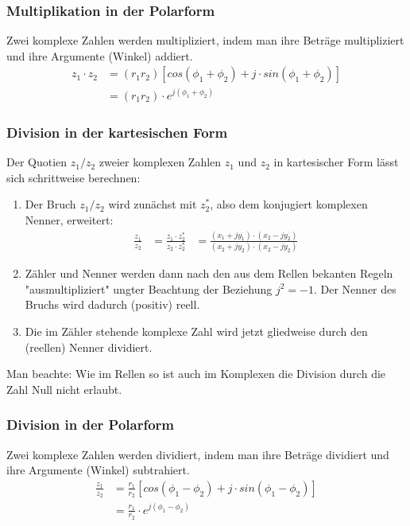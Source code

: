 \subsubsection*{Multiplikation in der Polarform}
\begin{definition}
Zwei komplexe Zahlen werden multipliziert, indem man ihre Beträge multipliziert und ihre Argumente (Winkel) addiert.
\begin{align*}
	z_1 \cdot z_2 	&= (r_1r_2)[cos(\phi_1 +\phi_2) +j \cdot sin(\phi_1 + \phi_2)] \\
							&= (r_1r_2) \cdot e^{j(\phi_1 + \phi_2)}
\end{align*}
\end{definition}

\subsubsection*{Division in der kartesischen Form}
\begin{definition}
Der Quotien $z_1/z_2$ zweier komplexen Zahlen $z_1$ und $z_2$ in kartesischer Form lässt sich schrittweise berechnen:
\begin{enumerate}
	\item Der Bruch $z_1/z_2$ wird zunächst mit $z_2^*$, also dem konjugiert komplexen Nenner, erweitert:
	\begin{align*}
	\frac{z_1}{z_2} 	&= \frac{z_1 \cdot z_2^*}{z_2 \cdot z_2^*} &= \frac{(x_1 +jy_1) \cdot (x_2-jy_2)}{(x_2+jy_2)\cdot (x_2-jy_2)}
\end{align*}
	\item Zähler und Nenner werden dann nach den aus dem Rellen bekanten Regeln "ausmultipliziert" ungter Beachtung der Beziehung $j^2 = -1$. Der Nenner des Bruchs wird dadurch (positiv) reell.
	\item Die im Zähler stehende komplexe Zahl wird jetzt gliedweise durch den (reellen) Nenner dividiert.
\end{enumerate}
Man beachte: Wie im Rellen so ist auch im Komplexen die Division durch die Zahl Null nicht erlaubt.
\end{definition}

\subsubsection*{Division in der Polarform}
\begin{definition}
Zwei komplexe Zahlen werden dividiert, indem man ihre Beträge dividiert und ihre Argumente (Winkel) subtrahiert.
\begin{align*}
	\frac{z_1}{z_2} 	&= \frac{r_1}{r_2}[cos(\phi_1 -\phi_2) +j \cdot sin(\phi_1 - \phi_2)] \\
							&= \frac{r_1}{r_2} \cdot e^{j(\phi_1 - \phi_2)}
\end{align*}
\end{definition}

